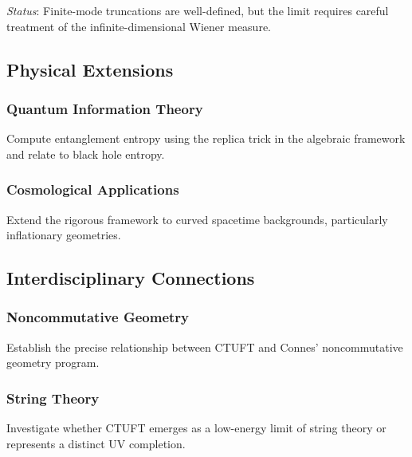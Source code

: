 \textit{Status}: Finite-mode truncations are well-defined, but the limit requires careful treatment of the infinite-dimensional Wiener measure.

\subsection{Physical Extensions}

\subsubsection{Quantum Information Theory}

\begin{problem}
Compute entanglement entropy using the replica trick in the algebraic framework and relate to black hole entropy.
\end{problem}

\subsubsection{Cosmological Applications}

\begin{problem}
Extend the rigorous framework to curved spacetime backgrounds, particularly inflationary geometries.
\end{problem}

\subsection{Interdisciplinary Connections}

\subsubsection{Noncommutative Geometry}

\begin{problem}
Establish the precise relationship between CTUFT and Connes' noncommutative geometry program.
\end{problem}

\subsubsection{String Theory}

\begin{problem}
Investigate whether CTUFT emerges as a low-energy limit of string theory or represents a distinct UV completion.
\end{problem}

